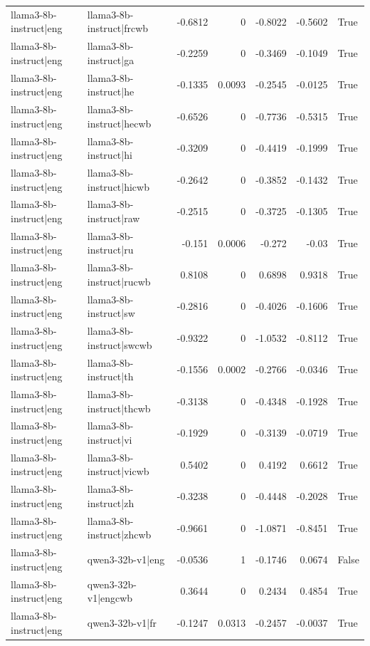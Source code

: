 \begin{table}
\begin{tabular}{l l r r r r l}
llama3-8b-instruct|eng & llama3-8b-instruct|frcwb & -0.6812 & 0 & -0.8022 & -0.5602 & True \\
llama3-8b-instruct|eng & llama3-8b-instruct|ga & -0.2259 & 0 & -0.3469 & -0.1049 & True \\
llama3-8b-instruct|eng & llama3-8b-instruct|he & -0.1335 & 0.0093 & -0.2545 & -0.0125 & True \\
llama3-8b-instruct|eng & llama3-8b-instruct|hecwb & -0.6526 & 0 & -0.7736 & -0.5315 & True \\
llama3-8b-instruct|eng & llama3-8b-instruct|hi & -0.3209 & 0 & -0.4419 & -0.1999 & True \\
llama3-8b-instruct|eng & llama3-8b-instruct|hicwb & -0.2642 & 0 & -0.3852 & -0.1432 & True \\
llama3-8b-instruct|eng & llama3-8b-instruct|raw & -0.2515 & 0 & -0.3725 & -0.1305 & True \\
llama3-8b-instruct|eng & llama3-8b-instruct|ru & -0.151 & 0.0006 & -0.272 & -0.03 & True \\
llama3-8b-instruct|eng & llama3-8b-instruct|rucwb & 0.8108 & 0 & 0.6898 & 0.9318 & True \\
llama3-8b-instruct|eng & llama3-8b-instruct|sw & -0.2816 & 0 & -0.4026 & -0.1606 & True \\
llama3-8b-instruct|eng & llama3-8b-instruct|swcwb & -0.9322 & 0 & -1.0532 & -0.8112 & True \\
llama3-8b-instruct|eng & llama3-8b-instruct|th & -0.1556 & 0.0002 & -0.2766 & -0.0346 & True \\
llama3-8b-instruct|eng & llama3-8b-instruct|thcwb & -0.3138 & 0 & -0.4348 & -0.1928 & True \\
llama3-8b-instruct|eng & llama3-8b-instruct|vi & -0.1929 & 0 & -0.3139 & -0.0719 & True \\
llama3-8b-instruct|eng & llama3-8b-instruct|vicwb & 0.5402 & 0 & 0.4192 & 0.6612 & True \\
llama3-8b-instruct|eng & llama3-8b-instruct|zh & -0.3238 & 0 & -0.4448 & -0.2028 & True \\
llama3-8b-instruct|eng & llama3-8b-instruct|zhcwb & -0.9661 & 0 & -1.0871 & -0.8451 & True \\
llama3-8b-instruct|eng & qwen3-32b-v1|eng & -0.0536 & 1 & -0.1746 & 0.0674 & False \\
llama3-8b-instruct|eng & qwen3-32b-v1|engcwb & 0.3644 & 0 & 0.2434 & 0.4854 & True \\
llama3-8b-instruct|eng & qwen3-32b-v1|fr & -0.1247 & 0.0313 & -0.2457 & -0.0037 & True \\

\end{tabular}
\end{table}
